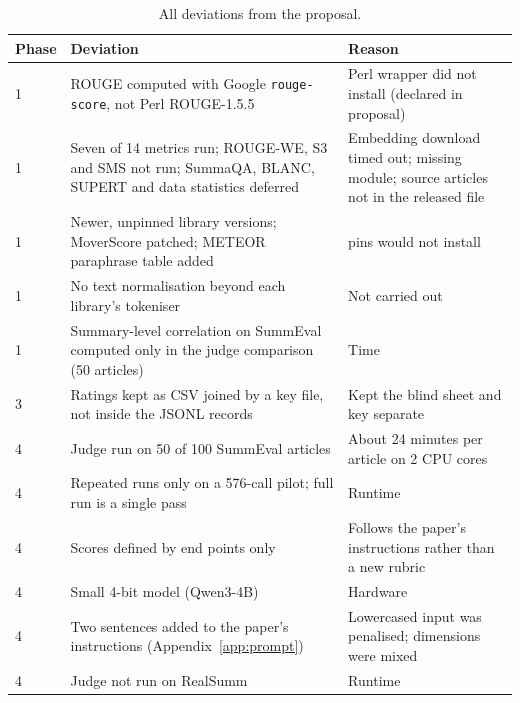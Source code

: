 \documentclass[11pt]{article}
\begin{document}
\begin{table}[h!]
\centering
\small
\begin{tabularx}{\columnwidth}{@{}l>{\raggedright\arraybackslash}X>{\raggedright\arraybackslash}X@{}}
\toprule
Phase & Deviation & Reason \\
\midrule
1 & ROUGE computed with Google \texttt{rouge-score}, not Perl ROUGE-1.5.5 & Perl wrapper did not install (declared in proposal) \\
1 & Seven of 14 metrics run; ROUGE-WE, S3 and SMS not run; SummaQA, BLANC, SUPERT and data statistics deferred & Embedding download timed out; missing module; source articles not in the released file \\
1 & Newer, unpinned library versions; MoverScore patched; METEOR paraphrase table added & 2020 pins would not install \\
1 & No text normalisation beyond each library's tokeniser & Not carried out \\
1 & Summary-level correlation on SummEval computed only in the judge comparison (50 articles) & Time \\
3 & Ratings kept as CSV joined by a key file, not inside the JSONL records & Kept the blind sheet and key separate \\
4 & Judge run on 50 of 100 SummEval articles & About 24 minutes per article on 2 CPU cores \\
4 & Repeated runs only on a 576-call pilot; full run is a single pass & Runtime \\
4 & Scores defined by end points only & Follows the paper's instructions rather than a new rubric \\
4 & Small 4-bit model (Qwen3-4B) & Hardware \\
4 & Two sentences added to the paper's instructions (Appendix~\ref{app:prompt}) & Lowercased input was penalised; dimensions were mixed \\
4 & Judge not run on RealSumm & Runtime \\
\bottomrule
\end{tabularx}
\caption{All deviations from the proposal.}
\label{tab:deviations}
\end{table}
\end{document}
